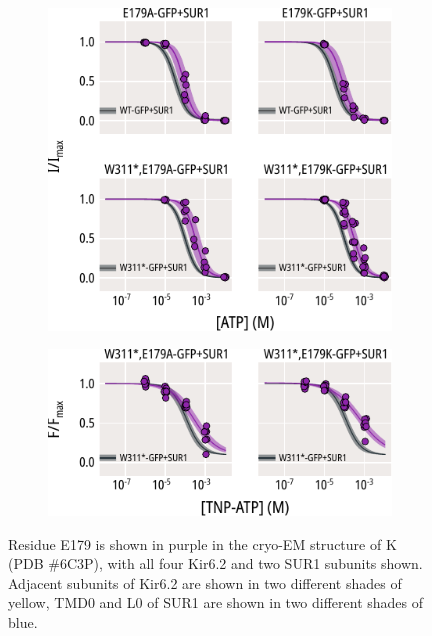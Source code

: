 \begin{figure}[h]
\begin{subfigure}[t]{0.45\textwidth}
	\end{subfigure}
	\vfill
	\begin{subfigure}[t]{0.45\textwidth}
		\caption{}\label{ch5fig:e179_atp_popfits}
		\centering
		\includegraphics[width=\textwidth]{e179_2.pdf}
	\end{subfigure}
	\hfill
	\begin{subfigure}[t]{0.45\textwidth}
		\caption{}\label{ch5fig:e179_tnpatp_popfits_2}
		\centering
		\includegraphics[width=\textwidth]{e179_4.pdf}
	\end{subfigure}
	\caption[Functional effects of E179 mutations]{
	 Residue E179 is shown in purple in the cryo-EM structure of K\ATP{} (PDB \#6C3P), with all four Kir6.2 and two SUR1 subunits shown.
	Adjacent subunits of Kir6.2 are shown in two different shades of yellow, TMD0 and L0 of SUR1 are shown in two different shades of blue.
}
\end{figure}
